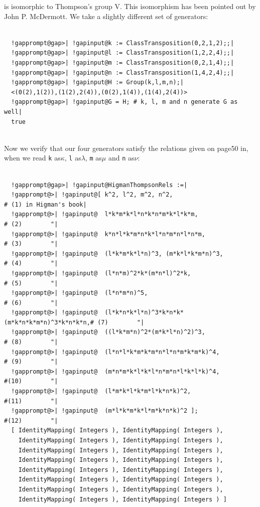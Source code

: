 \documentclass[a4paper,11pt]{report}
\begin{document}
{{\begin{Verbatim}[commandchars=!@|,fontsize=\small,frame=single,label=Example]
\end{Verbatim}
 is isomorphic to Thompson's group V. This isomorphism has been pointed out by
John P. McDermott. We take a slightly different set of generators: 
\begin{Verbatim}[commandchars=!@|,fontsize=\small,frame=single,label=Example]
  
  !gapprompt@gap>| !gapinput@k := ClassTransposition(0,2,1,2);;|
  !gapprompt@gap>| !gapinput@l := ClassTransposition(1,2,2,4);;|
  !gapprompt@gap>| !gapinput@m := ClassTransposition(0,2,1,4);;|
  !gapprompt@gap>| !gapinput@n := ClassTransposition(1,4,2,4);;|
  !gapprompt@gap>| !gapinput@H := Group(k,l,m,n);|
  <(0(2),1(2)),(1(2),2(4)),(0(2),1(4)),(1(4),2(4))>
  !gapprompt@gap>| !gapinput@G = H; # k, l, m and n generate G as well|
  true
  
\end{Verbatim}
 Now we verify that our four generators satisfy the relations given on
page{\nobreakspace}50 in{\nobreakspace}\cite{Higman74}, when we read \texttt{k} as{\nobreakspace}$\kappa$, \texttt{l} as{\nobreakspace}$\lambda$, \texttt{m} as{\nobreakspace}$\mu$ and \texttt{n} as{\nobreakspace}$\nu$: 
\begin{Verbatim}[commandchars=!@|,fontsize=\small,frame=single,label=Example]
  
  !gapprompt@gap>| !gapinput@HigmanThompsonRels :=|
  !gapprompt@>| !gapinput@[ k^2, l^2, m^2, n^2,                           # (1) in Higman's book|
  !gapprompt@>| !gapinput@  l*k*m*k*l*n*k*n*m*k*l*k*m,                    # (2)        "|
  !gapprompt@>| !gapinput@  k*n*l*k*m*n*k*l*n*m*n*l*n*m,                  # (3)        "|
  !gapprompt@>| !gapinput@  (l*k*m*k*l*n)^3, (m*k*l*k*m*n)^3,             # (4)        "|
  !gapprompt@>| !gapinput@  (l*n*m)^2*k*(m*n*l)^2*k,                      # (5)        "|
  !gapprompt@>| !gapinput@  (l*n*m*n)^5,                                  # (6)        "|
  !gapprompt@>| !gapinput@  (l*k*n*k*l*n)^3*k*n*k*(m*k*n*k*m*n)^3*k*n*k*n,# (7)        "|
  !gapprompt@>| !gapinput@  ((l*k*m*n)^2*(m*k*l*n)^2)^3,                  # (8)        "|
  !gapprompt@>| !gapinput@  (l*n*l*k*m*k*m*n*l*n*m*k*m*k)^4,              # (9)        "|
  !gapprompt@>| !gapinput@  (m*n*m*k*l*k*l*n*m*n*l*k*l*k)^4,              #(10)        "|
  !gapprompt@>| !gapinput@  (l*m*k*l*k*m*l*k*n*k)^2,                      #(11)        "|
  !gapprompt@>| !gapinput@  (m*l*k*m*k*l*m*k*n*k)^2 ];                    #(12)        "|
  [ IdentityMapping( Integers ), IdentityMapping( Integers ), 
    IdentityMapping( Integers ), IdentityMapping( Integers ), 
    IdentityMapping( Integers ), IdentityMapping( Integers ), 
    IdentityMapping( Integers ), IdentityMapping( Integers ), 
    IdentityMapping( Integers ), IdentityMapping( Integers ), 
    IdentityMapping( Integers ), IdentityMapping( Integers ), 
    IdentityMapping( Integers ), IdentityMapping( Integers ), 
    IdentityMapping( Integers ), IdentityMapping( Integers ) ]
  

\end{Verbatim}}}
\end{document}
